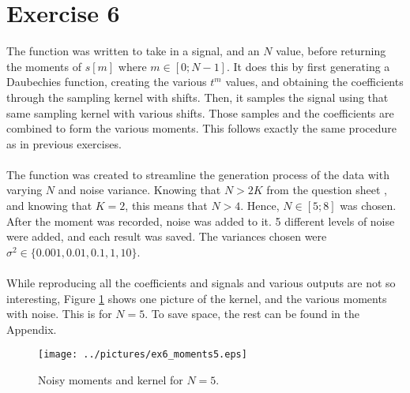 \documentclass[11pt,a4paper]{report}
\newcommand{\mychapter}[2]
{
    \setcounter{chapter}{#1}
    \setcounter{section}{0}
    \chapter*{#2}
    \addcontentsline{toc}{chapter}{#2}
}
\begin{document}
\mychapter{6}{Exercise 6}
The function  was written to take in a signal, and an $N$ value, before returning the moments of $s[m]$ where $m\in[0;N-1]$. It does this by first generating a Daubechies function, creating the various $t^m$ values, and obtaining the coefficients through the sampling kernel with shifts. Then, it samples the signal using that same sampling kernel with various shifts. Those samples and the coefficients are combined to form the various moments. This follows exactly the same procedure as in previous exercises.
\\\\
The function was created to streamline the generation process of the data with varying $N$ and noise variance. Knowing that $N > 2K$ from the question sheet \cite{question}, and knowing that $K =2$, this means that $N > 4$. Hence, $N \in [5;8]$ was chosen. After the moment was recorded, noise was added to it. 5 different levels of noise were added, and each result was saved. The variances chosen were $\sigma^2 \in \{0.001, 0.01, 0.1, 1, 10\}$.
\\\\
While reproducing all the coefficients and signals and various outputs are not so interesting, Figure \ref{fig:ex6} shows one picture of the kernel, and the various moments with noise. This is for $N = 5$. To save space, the rest can be found in the Appendix.

\begin{figure}[!ht]
    \centering
    \texttt{[image: ../pictures/ex6\_moments5.eps]}
    \caption{Noisy moments and kernel for $N = 5$.}
    \label{fig:ex6}
\end{figure}
\end{document}
